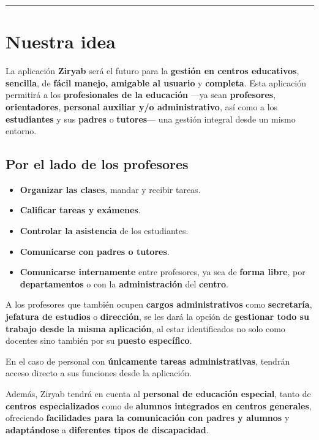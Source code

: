 \documentclass[
  spanish,
  11pt,
]{report}
\providecommand{\tightlist}{%
  \setlength{\itemsep}{0pt}\setlength{\parskip}{0pt}}
\begin{document}
\begin{center}\rule{0.5\linewidth}{0.5pt}\end{center}

\section{Nuestra idea}\label{nuestra-idea}

La aplicación \textbf{Ziryab} será el futuro para la \textbf{gestión en
centros educativos}, \textbf{sencilla}, de \textbf{fácil manejo,
amigable al usuario} y \textbf{completa}. Esta aplicación permitirá a
los \textbf{profesionales de la educación} ---ya sean
\textbf{profesores}, \textbf{orientadores}, \textbf{personal auxiliar
y/o administrativo}, así como a los \textbf{estudiantes} y sus
\textbf{padres} o \textbf{tutores}--- una gestión integral desde un
mismo entorno.

\subsection{Por el lado de los
profesores}\label{por-el-lado-de-los-profesores}

\begin{itemize}
\tightlist
\item
  \textbf{Organizar las clases}, mandar y recibir tareas.
\item
  \textbf{Calificar tareas y exámenes}.
\item
  \textbf{Controlar la asistencia} de los estudiantes.
\item
  \textbf{Comunicarse con padres o tutores}.
\item
  \textbf{Comunicarse internamente} entre profesores, ya sea de
  \textbf{forma libre}, por \textbf{departamentos} o con la
  \textbf{administración} del \textbf{centro}.
\end{itemize}

A los profesores que también ocupen \textbf{cargos administrativos} como
\textbf{secretaría}, \textbf{jefatura de estudios} o \textbf{dirección},
se les dará la opción de \textbf{gestionar todo su trabajo desde la
misma aplicación}, al estar identificados no solo como docentes sino
también por su \textbf{puesto específico}.

En el caso de personal con \textbf{únicamente tareas administrativas},
tendrán acceso directo a sus funciones desde la aplicación.

Además, Ziryab tendrá en cuenta al \textbf{personal de educación
especial}, tanto de \textbf{centros especializados} como de
\textbf{alumnos integrados en centros generales}, ofreciendo
\textbf{facilidades para la comunicación con padres y alumnos} y
\textbf{adaptándose} a \textbf{diferentes tipos de discapacidad}.
\end{document}
